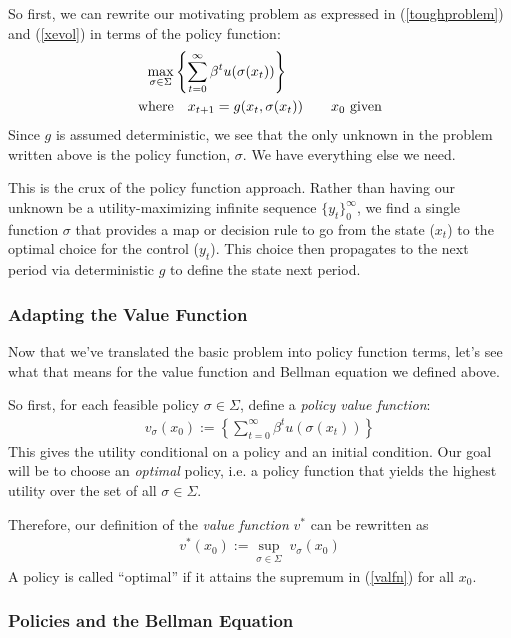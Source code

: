 \documentclass[a4paper,12pt]{scrartcl}
\begin{document}
So first, we can rewrite our motivating problem as
expressed in (\ref{toughproblem}) and (\ref{xevol}) in
terms of the policy function:
\begin{align}
  \label{policyapproach}
  \max_{\sigma \in \Sigma} 
  &\left\{ \sum^\infty_{t=0} \beta^t u(\sigma(x_t)) \right\}\\
  \text{where} &\quad
  x_{t+1} = g(x_t, \sigma(x_t)) 
  \qquad \text{$x_0$ given}
  \notag
\end{align}
Since $g$ is assumed deterministic, we see that the only
unknown in the problem written above is the policy
function, $\sigma$. We have everything else we need.

This is the crux of the policy function approach.
Rather than having our unknown be a utility-maximizing
infinite sequence $\{y_t\}^\infty_0$, we find a single
function $\sigma$ that provides a map or decision rule to
go from the state ($x_t$) to the optimal choice for the
control ($y_t$).  This choice then propagates to the next
period via deterministic $g$ to define the state next
period.

\subsubsection{Adapting the Value Function}

Now that we've translated the basic problem into policy
function terms, let's see what that means for the value
function and Bellman equation we defined above.

So first, for each feasible policy $\sigma\in
\Sigma$, define a \emph{policy value
function}: \begin{align*}
  v_\sigma(x_0) :=
  \left\{ \sum^\infty_{t=0} \beta^t u(\sigma(x_t)) \right\}
\end{align*}
This gives the utility conditional on a policy and an initial
condition.  Our goal will be to choose an \emph{optimal} policy,
i.e. a policy function that yields the highest utility over the
set of all $\sigma \in \Sigma$.

Therefore, our definition of the \emph{value function} $v^*$ can
be rewritten as
\begin{align}
  \label{valfn}
  v^*(x_0) := \sup_{\sigma\in\Sigma} \; v_\sigma(x_0)
\end{align}
A policy is called ``optimal'' if it attains the supremum in
(\ref{valfn}) for all $x_0$. 

\subsubsection{Policies and the Bellman Equation}
\end{document}
